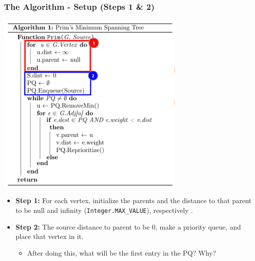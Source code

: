 \documentclass{beamer}
\begin{document}
\begin{frame}[fragile]
    \frametitle{The Algorithm - Setup (Steps 1 \& 2)}
    \centering
    \begin{minipage}{0.69\textwidth}
        \includegraphics[width=0.69\textwidth]{./imgs/prims-1-2.png}
    \end{minipage}
    \hspace{-3cm}
    \begin{minipage}{0.49\textwidth}
        \small
        \begin{itemize}
            \item \textbf{Step 1:} For each vertex, initialize the parents and the distance to that parent to be null and infinity (\texttt{Integer.MAX\_VALUE}), respectively .
            \item \textbf{Step 2:} The source distance to parent to be 0, make a priority queue, and place that vertex in it.
                \begin{itemize}
                    \item After doing this, what will be the first entry in the PQ? Why?
                \end{itemize}
        \end{itemize}
    \end{minipage}
\end{frame}
\end{document}
